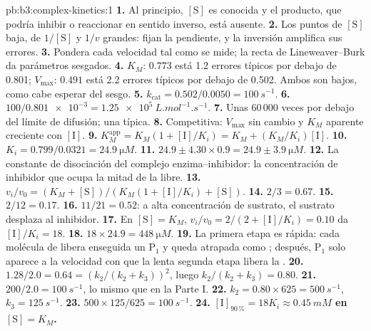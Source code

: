 \begin{solution}{pb:b3:complex-kinetics:1}
\textbf{1.} Al principio, $[\mathrm S]$ es conocida y el producto, que podría inhibir o reaccionar
en sentido inverso, está ausente.
\textbf{2.} Los puntos de $[\mathrm S]$ baja, de $1/[\mathrm S]$ y $1/v$ grandes: fijan la pendiente, y la
inversión amplifica sus errores.
\textbf{3.} Pondera cada velocidad tal como se mide; la recta de Lineweaver--Burk da
parámetros sesgados.
\textbf{4.} $K_M$: $0.773$ está 1.2 errores típicos por debajo de 0.801; $V_{\max}$: $0.491$ está 2.2 errores
típicos por debajo de 0.502. Ambos son bajos, como cabe esperar del sesgo.
\textbf{5.} $k_{\mathrm{cat}} = 0.502/0.0050 = \qty{100}{s^{-1}}$.
\textbf{6.} $100/\num{0.801e-3} = \qty{1.25e5}{L.mol^{-1}.s^{-1}}$.
\textbf{7.} Unas 60\,000 veces por debajo del límite de difusión; una  típica.
\textbf{8.} Competitiva: $V_{\max}$ sin cambio y $K_M$ aparente creciente con $[\mathrm I]$.
\textbf{9.} $K_M^{\mathrm{app}} = K_M(1 + [\mathrm I]/K_i) = K_M + (K_M/K_i)[\mathrm I]$.
\textbf{10.} $K_i = 0.799/0.0321 = \qty{24.9}{\micro M}$.
\textbf{11.} $24.9 \pm 4.30 \times 0.9 = 24.9 \pm \qty{3.9}{\micro M}$.
\textbf{12.} La constante de disociación del complejo enzima--inhibidor: la
concentración de inhibidor que ocupa la mitad de la  libre.
\textbf{13.} $v_i/v_0 = (K_M + [\mathrm S])/(K_M(1 + [\mathrm I]/K_i) + [\mathrm S])$.
\textbf{14.} $2/3 = 0.67$.
\textbf{15.} $2/12 = 0.17$.
\textbf{16.} $11/21 = 0.52$: a alta concentración de sustrato, el sustrato desplaza
al inhibidor.
\textbf{17.} En $[\mathrm S] = K_M$, $v_i/v_0 = 2/(2 + [\mathrm I]/K_i) = 0.10$ da $[\mathrm I]/K_i = 18$.
\textbf{18.} $18 \times 24.9 = \qty{448}{\micro M}$.
\textbf{19.} La primera etapa es rápida: cada molécula de  libera enseguida un $\mathrm P_1$
y queda atrapada como ; después, $\mathrm P_1$ solo aparece a la velocidad con que la lenta
segunda etapa libera la .
\textbf{20.} $1.28/2.0 = 0.64 = (k_2/(k_2 + k_3))^2$, luego $k_2/(k_2 + k_3) = 0.80$.
\textbf{21.} $200/2.0 = \qty{100}{s^{-1}}$, lo mismo que en la Parte I.
\textbf{22.} $k_2 = 0.80 \times 625 = \qty{500}{s^{-1}}$, $k_3 = \qty{125}{s^{-1}}$.
\textbf{23.} $500 \times 125/625 = \qty{100}{s^{-1}}$.
\textbf{24.} \textbf{$[\mathrm I]_{90\,\%} = 18K_i \approx \qty{0.45}{mM}$ en $[\mathrm S] = K_M$.}
\end{solution}
